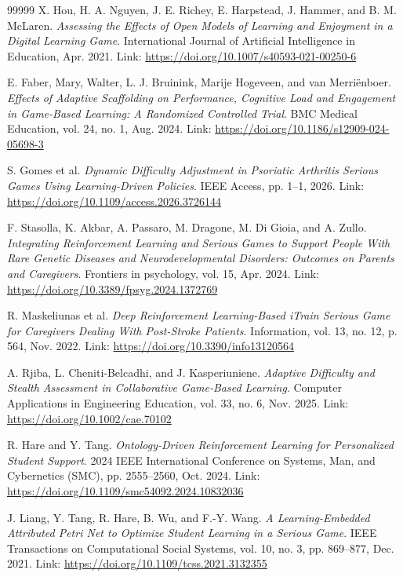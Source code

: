 \documentclass[12pt,a4paper]{report}
\begin{document}
\begin{thebibliography}{99999}
 X. Hou, H. A. Nguyen, J. E. Richey, E. Harpstead, J. Hammer, and B. M. McLaren. \textit{Assessing the Effects of Open Models of Learning and Enjoyment in a Digital Learning Game}. International Journal of Artificial Intelligence in Education, Apr. 2021. Link: \url{https://doi.org/10.1007/s40593-021-00250-6}

 E. Faber, Mary, Walter, L. J. Bruinink, Marije Hogeveen, and van Merriënboer. \textit{Effects of Adaptive Scaffolding on Performance, Cognitive Load and Engagement in Game-Based Learning: A Randomized Controlled Trial}. BMC Medical Education, vol. 24, no. 1, Aug. 2024. Link: \url{https://doi.org/10.1186/s12909-024-05698-3}

 S. Gomes et al. \textit{Dynamic Difficulty Adjustment in Psoriatic Arthritis Serious Games Using Learning-Driven Policies}. IEEE Access, pp. 1–1, 2026. Link: \url{https://doi.org/10.1109/access.2026.3726144}

 F. Stasolla, K. Akbar, A. Passaro, M. Dragone, M. Di Gioia, and A. Zullo. \textit{Integrating Reinforcement Learning and Serious Games to Support People With Rare Genetic Diseases and Neurodevelopmental Disorders: Outcomes on Parents and Caregivers}. Frontiers in psychology, vol. 15, Apr. 2024. Link: \url{https://doi.org/10.3389/fpsyg.2024.1372769}

 R. Maskeliunas et al. \textit{Deep Reinforcement Learning-Based iTrain Serious Game for Caregivers Dealing With Post-Stroke Patients}. Information, vol. 13, no. 12, p. 564, Nov. 2022. Link: \url{https://doi.org/10.3390/info13120564}

 A. Rjiba, L. Cheniti‐Belcadhi, and J. Kasperiuniene. \textit{Adaptive Difficulty and Stealth Assessment in Collaborative Game‐Based Learning}. Computer Applications in Engineering Education, vol. 33, no. 6, Nov. 2025. Link: \url{https://doi.org/10.1002/cae.70102}

 R. Hare and Y. Tang. \textit{Ontology-Driven Reinforcement Learning for Personalized Student Support}. 2024 IEEE International Conference on Systems, Man, and Cybernetics (SMC), pp. 2555–2560, Oct. 2024. Link: \url{https://doi.org/10.1109/smc54092.2024.10832036}

 J. Liang, Y. Tang, R. Hare, B. Wu, and F.-Y. Wang. \textit{A Learning-Embedded Attributed Petri Net to Optimize Student Learning in a Serious Game}. IEEE Transactions on Computational Social Systems, vol. 10, no. 3, pp. 869–877, Dec. 2021. Link: \url{https://doi.org/10.1109/tcss.2021.3132355}


\end{thebibliography}
\end{document}
